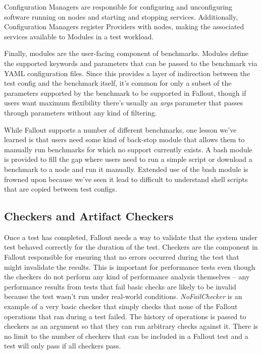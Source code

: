 \documentclass[a4paper,fleqn]{cas-dc}
\begin{document}
Configuration Managers are responsible for configuring and unconfiguring software running on nodes
and starting and stopping services. Additionally, Configuration Managers register Providers with
nodes, making the associated services available to Modules in a test workload.

Finally, modules are the user-facing component of benchmarks. Modules define the supported keywords
and parameters that can be passed to the benchmark via YAML configuration files. Since this
provides a layer of indirection between the test config and the benchmark itself, it’s common for
only a subset of the parameters supported by the benchmark to be supported in Fallout, though if
users want maximum flexibility there’s usually an \emph{args} parameter that passes through parameters
without any kind of filtering.

While Fallout supports a number of different benchmarks, one lesson we’ve learned is that users need
some kind of back-stop module that allows them to manually run benchmarks for which no support
currently exists. A bash module is provided to fill the gap where users need to run a simple script
or download a benchmark to a node and run it manually. Extended use of the bash module is frowned
upon because we’ve seen it lead to difficult to understand shell scripts that are copied between
test configs.

\subsection{Checkers and Artifact Checkers}

Once a test has completed, Fallout needs a way to validate that the system under test behaved
correctly for the duration of the test. Checkers are the component in Fallout responsible for
ensuring that no errors occurred during the test that might invalidate the results. This is
important for performance tests even though the checkers do not perform any kind of performance
analysis themselves -- any performance results from tests that fail basic checks are likely to be
invalid because the test wasn’t run under real-world conditions. \emph{NoFailChecker} is an example of
a very basic checker that simply checks that none of the Fallout operations that ran during a test
failed. The history of operations is passed to checkers as an argument so that they can run arbitrary
checks against it. There is no limit to the number of checkers that can be included in a Fallout
test and a test will only pass if all checkers pass.
\end{document}
